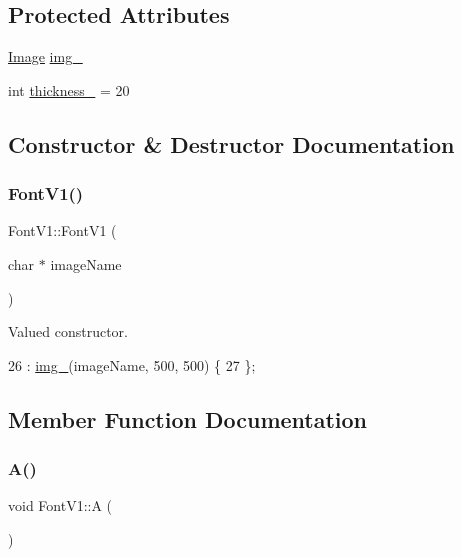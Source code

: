 \subsection*{Protected Attributes}
\begin{DoxyCompactItemize}
\item 
\mbox{\hyperlink{class_image}{Image}} \mbox{\hyperlink{class_font_v1_a00569e3e3c4b70f437b63f396f735fb0}{img\+\_\+}}
\item 
int \mbox{\hyperlink{class_font_v1_aed8040e76be9a52833627b92f0fb4e5f}{thickness\+\_\+}} = 20
\end{DoxyCompactItemize}


\subsection{Constructor \& Destructor Documentation}
\mbox{\label{class_font_v1_ada1ed699d42679f81146af4bc20db006}} 
\subsubsection{\texorpdfstring{Font\+V1()}{FontV1()}}
{\footnotesize\ttfamily Font\+V1\+::\+Font\+V1 (\begin{DoxyParamCaption}\item[{char $\ast$}]{image\+Name }\end{DoxyParamCaption})\hspace{0.3cm}{\ttfamily [inline]}}



Valued constructor. 


\begin{DoxyCode}
26                                 : \mbox{\hyperlink{class_font_v1_a00569e3e3c4b70f437b63f396f735fb0}{img\_}}(imageName, 500, 500) \{
27         \};
\end{DoxyCode}


\subsection{Member Function Documentation}
\mbox{\label{class_font_v1_a29afd2079bc41cdec9d3de6bb4e1be52}} 
\subsubsection{\texorpdfstring{A()}{A()}}
{\footnotesize\ttfamily void Font\+V1\+::A (\begin{DoxyParamCaption}{ }\end{DoxyParamCaption})}



